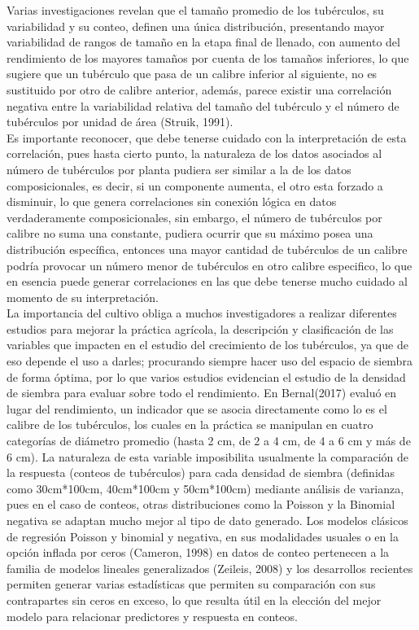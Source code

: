 Varias investigaciones revelan que el tamaño promedio de los tubérculos, su variabilidad y su conteo, definen una única distribución, presentando mayor variabilidad de rangos de tamaño en la etapa final de llenado, con aumento del rendimiento de los mayores tamaños por cuenta de los tamaños inferiores, lo que sugiere que un tubérculo que pasa de un calibre inferior al siguiente, no es sustituido por otro de calibre anterior, además, parece existir una correlación negativa entre la variabilidad relativa del tamaño del tubérculo y el número de tubérculos por unidad de área (Struik, 1991).\\

Es importante reconocer, que debe tenerse cuidado con la interpretación de esta correlación, pues hasta cierto punto, la naturaleza de los datos asociados al número de tubérculos por planta pudiera ser similar a la de los datos composicionales, es decir, si un componente aumenta, el otro esta forzado a disminuir, lo que genera correlaciones sin conexión lógica en datos verdaderamente composicionales, sin embargo, el número de tubérculos por calibre no suma una constante, pudiera ocurrir que su máximo posea una distribución específica, entonces una mayor cantidad de tubérculos de un calibre podría provocar un número menor de tubérculos en otro calibre especifico, lo que en esencia puede generar correlaciones en las que debe tenerse mucho cuidado al momento de su interpretación.\\

 La importancia del cultivo obliga a muchos investigadores a realizar diferentes estudios para mejorar la práctica agrícola, la descripción y clasificación de las variables que impacten en el estudio del crecimiento de los tubérculos, ya que de eso depende el uso a darles;   procurando siempre hacer uso del espacio de siembra de forma óptima, por lo que varios estudios evidencian el estudio de la densidad de siembra para evaluar sobre todo el rendimiento. En  Bernal(2017) evaluó en lugar del rendimiento, un indicador que se asocia directamente como lo es el calibre de los tubérculos, los cuales en la práctica se manipulan en cuatro categorías de diámetro promedio (hasta 2 cm, de 2 a 4 cm, de 4 a 6 cm y más de 6 cm). La naturaleza de esta variable imposibilita usualmente la comparación de la respuesta (conteos de tubérculos) para cada densidad de siembra (definidas como 30cm*100cm, 40cm*100cm y 50cm*100cm) mediante análisis de varianza, pues en el caso de conteos, otras distribuciones como la Poisson y la Binomial negativa se adaptan mucho mejor al tipo de dato generado. Los modelos clásicos de regresión Poisson y binomial y negativa, en sus modalidades usuales o en la opción inflada por ceros (Cameron, 1998) en datos de conteo pertenecen a la familia de modelos lineales generalizados (Zeileis, 2008) y los desarrollos recientes permiten generar varias estadísticas que permiten su comparación con sus contrapartes sin ceros en exceso, lo que resulta útil en la elección del mejor modelo para relacionar predictores y respuesta en conteos.\\

